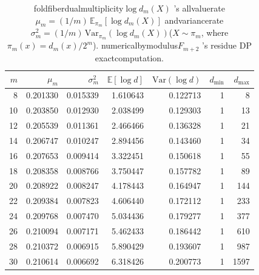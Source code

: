 \begin{table}[H]
\centering
\scriptsize
\setlength{\tabcolsep}{6pt}
\caption{foldfiberdualmultiplicity$\log d_m(X)$ 's allvaluerate$\mu_m=(1/m)\,\mathbb{E}_{\pi_m}[\log d_m(X)]$ andvariancerate$\sigma_m^2=(1/m)\,\mathrm{Var}_{\pi_m}(\log d_m(X))$($X\sim\pi_m$, where$\pi_m(x)=d_m(x)/2^m$). numericalbymodulus$F_{m+2}$ 's  residue DP exactcomputation.}
\label{tab:fold_fiber_log_moments_mu_sigma}
\begin{tabular}{r r r r r r r}
\toprule
$m$ & $\mu_m$ & $\sigma_m^2$ & $\mathbb{E}[\log d]$ & $\mathrm{Var}(\log d)$ & $d_{\min}$ & $d_{\max}$\\
\midrule
8 & 0.201330 & 0.015339 & 1.610643 & 0.122713 & 1 & 8\\
10 & 0.203850 & 0.012930 & 2.038499 & 0.129303 & 1 & 13\\
12 & 0.205539 & 0.011361 & 2.466466 & 0.136328 & 1 & 21\\
14 & 0.206747 & 0.010247 & 2.894456 & 0.143460 & 1 & 34\\
16 & 0.207653 & 0.009414 & 3.322451 & 0.150618 & 1 & 55\\
18 & 0.208358 & 0.008766 & 3.750447 & 0.157782 & 1 & 89\\
20 & 0.208922 & 0.008247 & 4.178443 & 0.164947 & 1 & 144\\
22 & 0.209384 & 0.007823 & 4.606440 & 0.172112 & 1 & 233\\
24 & 0.209768 & 0.007470 & 5.034436 & 0.179277 & 1 & 377\\
26 & 0.210094 & 0.007171 & 5.462433 & 0.186442 & 1 & 610\\
28 & 0.210372 & 0.006915 & 5.890429 & 0.193607 & 1 & 987\\
30 & 0.210614 & 0.006692 & 6.318426 & 0.200773 & 1 & 1597\\
\bottomrule
\end{tabular}
\end{table}
